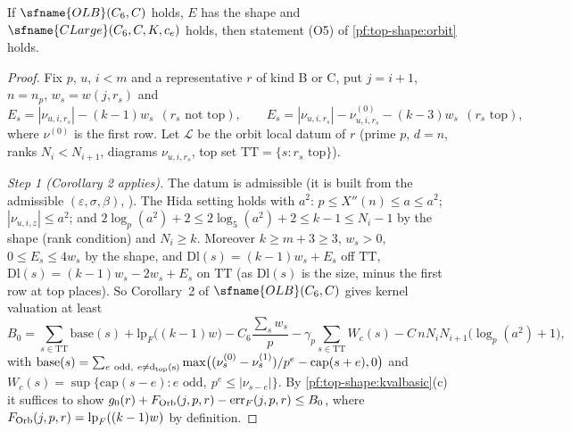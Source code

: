 \begin{proposition}\label{pf:top-shape:o5}
If $\sfname{OLB}(C_6,C)$ holds, $E$ has the shape and $\sfname{CLarge}(C_6,C,K,c_e)$ holds, then statement (O5) of
\cref{pf:top-shape:orbit} holds.
\end{proposition}

\begin{proof}
Fix $p$, $u$, $i<m$ and a representative $r$ of kind B or C, put $j=i+1$, $n=n_p$, $w_s=w(j,r_s)$ and
\[
E_s=|\nu_{u,i,r_s}|-(k-1)w_s\ \ (r_s\text{ not top}),\qquad E_s=|\nu_{u,i,r_s}|-\nu^{(0)}_{u,i,r_s}-(k-3)w_s\ \ (r_s\text{ top}),
\]
where $\nu^{(0)}$ is the first row. Let $\mathcal L$ be the orbit local datum of $r$ (prime $p$, $d=n$, ranks $N_i<N_{i+1}$,
diagrams $\nu_{u,i,r_s}$, top set $\mathrm{TT}=\{s:r_s\text{ top}\}$).

\emph{Step 1 (Corollary 2 applies).} The datum is admissible (it is built from the admissible $(\varepsilon,\sigma,\beta)$,
). The Hida setting holds with $a^2$: $p\le X''(n)\le a\le a^2$;
$|\nu_{u,i,z}|\le a^2$; and $2\log_p(a^2)+2\le2\log_5(a^2)+2\le k-1\le N_i-1$ by the shape (rank condition) and
$N_i\ge k$. Moreover $k\ge m+3\ge3$, $w_s>0$, $0\le E_s\le4w_s$ by the shape, and $\mathrm{Dl}(s)=(k-1)w_s+E_s$ off
$\mathrm{TT}$, $\mathrm{Dl}(s)=(k-1)w_s-2w_s+E_s$ on $\mathrm{TT}$ (as $\mathrm{Dl}(s)$ is the size, minus the first row at top
places). So Corollary~2 of $\sfname{OLB}(C_6,C)$ gives kernel valuation at least
\[
B_0=\sum_{s\in\mathrm{TT}}\mathrm{base}(s)+\mathrm{lp}_F\bigl((k-1)w\bigr)-C_6\frac{\sum_sw_s}p-\gamma_p\sum_{s\in\mathrm{TT}}W_c(s)
-C\,nN_iN_{i+1}\bigl(\log_p(a^2)+1\bigr),
\]
with $\mathrm{base}(s)=\sum_{e\ \rm odd,\ e\ne d_{\rm top}(s)}\max\bigl((\nu^{(0)}_s-\nu^{(1)}_s)/p^e-\mathrm{cap}(s+e),0\bigr)$ and
$W_c(s)=\sup\{\mathrm{cap}(s-e):e\text{ odd},\ p^e\le|\nu_{s-e}|\}$. By \cref{pf:top-shape:kvalbasic}(c) it suffices to show
$g_0(r)+F_{\rm Orb}(j,p,r)-\mathrm{err}_F(j,p,r)\le B_0$, where $F_{\rm Orb}(j,p,r)=\mathrm{lp}_F((k-1)w)$ by definition.


\end{proof}
